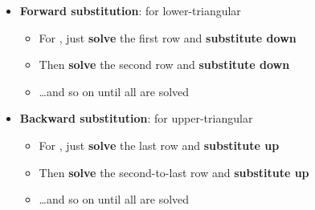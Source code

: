 \begin{itemize}

\item
  \textbf{Forward substitution}: for lower-triangular

  \begin{itemize}
  
  \item
    For , just \textbf{solve} the first row
    and \textbf{substitute down}
  \item
    Then \textbf{solve} the second row
    and \textbf{substitute down}
  \item
    \ldots and so on until all  are solved
  \end{itemize}
\item
  \textbf{Backward substitution}: for upper-triangular

  \begin{itemize}
  
  \item
    For , just \textbf{solve} the last row
    and \textbf{substitute up}
  \item
    Then \textbf{solve} the second-to-last row
    and \textbf{substitute up}
  \item
    \ldots and so on until all  are solved
  \end{itemize}
\end{itemize}